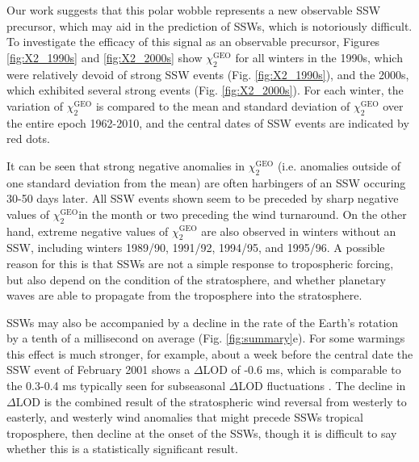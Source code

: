 \documentclass[draft,jgrga]{agutex}
\begin{document}
\begin{article}
Our work suggests that this polar wobble represents a new observable SSW precursor, which  may aid in the prediction of SSWs, which is notoriously difficult.
 {To investigate the efficacy of this signal as an observable precursor, Figures} \ref{fig:X2_1990s} and \ref{fig:X2_2000s}  {show $\chi_2^{\text{GEO}}$ for all winters in the 1990s, which were relatively devoid of strong SSW events} (Fig. \ref{fig:X2_1990s}),  {and the 2000s, which exhibited several strong events} (Fig. \ref{fig:X2_2000s}).
 {For each winter, the variation of $\chi_2^{\text{GEO}}$ is compared to the mean and standard deviation of $\chi_2^{\text{GEO}}$ over the entire epoch 1962-2010, and the central dates of SSW events are indicated by red dots.}

 {It can be seen that strong negative anomalies in $\chi_2^{\text{GEO}}$ (i.e. anomalies outside of one standard deviation from the mean) are often harbingers of an SSW occuring 30-50 days later.
All SSW events shown seem to be preceded by sharp negative values of $\chi_2^{\text{GEO}}$in the month or two preceding the wind turnaround.
On the other hand, extreme negative values of $\chi_2^{\text{GEO}}$ are also observed in winters without an SSW, including winters 1989/90, 1991/92, 1994/95, and 1995/96.
A possible reason for this is that SSWs are not a simple response to tropospheric forcing, but also depend on the condition of the stratosphere, and whether planetary waves are able to propagate from the troposphere into the stratosphere. }


SSWs may also be accompanied by a decline in the rate of the Earth's rotation by a tenth of a millisecond on average (Fig. \ref{fig:summary}e).
For some warmings this effect is much stronger, for example, about a week before the central date the SSW event of February 2001 shows a $\Delta$LOD of -0.6 ms, which is comparable to the  0.3-0.4 ms typically seen for subseasonal $\Delta$LOD fluctuations \citep{eubanksetal1985,rosenetal1991}.
The decline in $\Delta$LOD is the combined result of the stratospheric wind reversal from westerly to easterly, and  {westerly wind anomalies that might precede SSWs tropical troposphere, then decline at the onset of the SSWs, though it is difficult to say whether this is a statistically significant result}.


\end{article}
\end{document}
